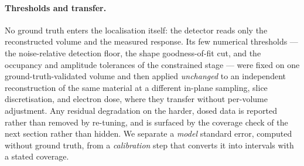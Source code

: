\paragraph{Thresholds and transfer.}
No ground truth enters the localisation itself: the detector reads only the reconstructed
volume and the measured response. Its few numerical thresholds --- the noise-relative
detection floor, the shape goodness-of-fit cut, and the occupancy and amplitude tolerances
of the constrained stage --- were fixed on one ground-truth-validated volume and then applied
\emph{unchanged} to an independent reconstruction of the same material at a different in-plane
sampling, slice discretisation, and electron dose, where they transfer without per-volume
adjustment. Any residual degradation on the harder, dosed data is reported rather than
removed by re-tuning, and is surfaced by the coverage check of the next section rather than
hidden.
We separate a \emph{model} standard error, computed without ground truth, from a
\emph{calibration} step that converts it into intervals with a stated coverage.

